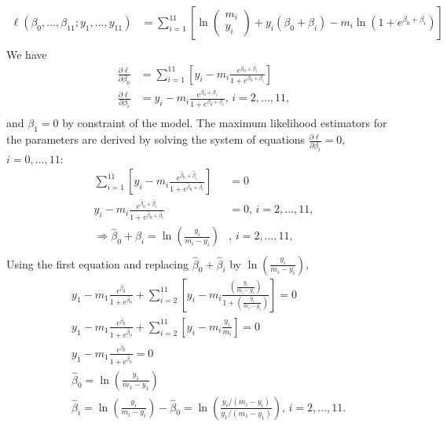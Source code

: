\begin{solution}{2.9}
\begin{enumerate}
\begin{align*}
\ell(\beta_{0},...,\beta_{11};y_{1},...,y_{11})&=\sum_{i=1}^{11} \left[\ln\begin{pmatrix} m_{i} \\ y_{i} \end{pmatrix}+y_{i}(\beta_{0}+\beta_{i})-m_{i}\ln(1+e^{\beta_{0}+\beta_{i}})\right]\\
\end{align*} We have
\begin{align*}
\frac{\partial \ell}{\partial \beta_{0}}&=\sum_{i=1}^{11} \left[y_{i}-m_{i}\frac{e^{\beta_{0}+\beta_{i}}}{1+e^{\beta_{0}+\beta_{i}}}\right]\\
\frac{\partial \ell}{\partial \beta_{i}}&=y_{i}-m_{i}\frac{e^{\beta_{0}+\beta_{i}}}{1+e^{\beta_{0}+\beta_{i}}} \mbox{,  } i=2,...,11,\\
\end{align*} and $\beta_{1}=0$ by constraint of the model. The maximum likelihood estimators for the parameters are derived by solving the system of equations $\frac{\partial \ell}{\partial \beta_{i}}=0,$ $i=0,...,11$:
\begin{align*}
\sum_{i=1}^{11} \left[y_{i}-m_{i}\frac{e^{\hat{\beta}_{0}+\hat{\beta}_{i}}}{1+e^{\hat{\beta}_{0}+\hat{\beta}_{i}}}\right]&=0\\
y_{i}-m_{i}\frac{e^{\hat{\beta}_{0}+\hat{\beta}_{i}}}{1+e^{\hat{\beta}_{0}+\hat{\beta}_{i}}}&=0 \mbox{,  } i=2,...,11,\\
\Rightarrow \hat{\beta}_{0}+\hat{\beta}_{i}=\ln\left(\frac{y_{i}}{m_{i}-y_{i}}\right)& \mbox{,  } i=2,...,11,\\
\end{align*}  Using the first equation and replacing $\hat{\beta}_{0}+\hat{\beta}_{i}$ by $\ln\left(\frac{y_{i}}{m_{i}-y_{i}}\right)$,
\begin{align*}
&y_{1}-m_{1}\frac{e^{\hat{\beta}_{0}}}{1+e^{\hat{\beta}_{0}}}+\sum_{i=2}^{11} \left[y_{i}-m_{i}\frac{\left(\frac{y_{i}}{m_{i}-y_{i}}\right)}{1+\left(\frac{y_{i}}{m_{i}-y_{i}}\right)}\right]=0\\
&y_{1}-m_{1}\frac{e^{\hat{\beta}_{0}}}{1+e^{\hat{\beta}_{0}}}+\sum_{i=2}^{11} \left[y_{i}-m_{i}\frac{y_{i}}{m_{i}}\right]=0\\
&y_{1}-m_{1}\frac{e^{\hat{\beta}_{0}}}{1+e^{\hat{\beta}_{0}}}=0\\
&\hat{\beta}_{0}=\ln\left(\frac{y_{1}}{m_{1}-y_{1}}\right)\\
&\hat{\beta}_{i}=\ln\left(\frac{y_{i}}{m_{i}-y_{i}}\right)-\hat{\beta}_{0}=\ln\left(\frac{y_{i}/(m_{i}-y_{i})}{y_{1}/(m_{1}-y_{1})}\right)  \mbox{,  } i=2,...,11.\\

\end{align*}
\end{enumerate}
\end{solution}
